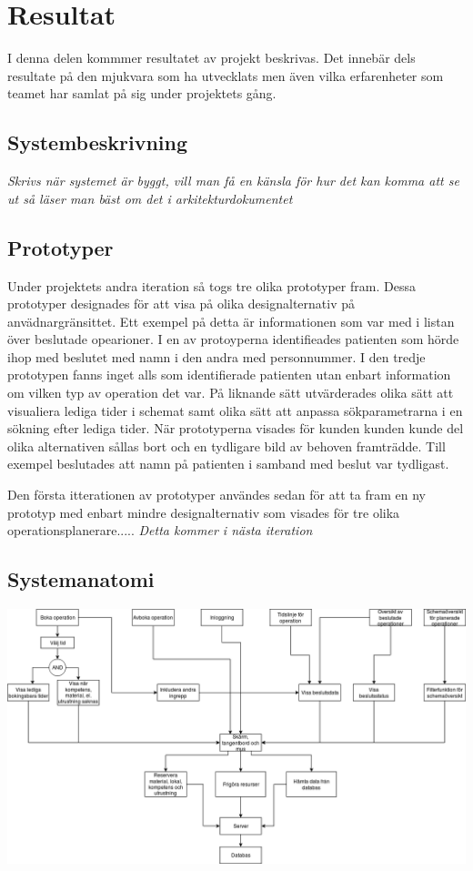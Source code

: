 \chapter{Resultat}
I denna delen kommmer resultatet av projekt beskrivas. Det innebär dels
resultate på den mjukvara som ha utvecklats men även vilka erfarenheter som
teamet har samlat på sig under projektets gång.
\section{Systembeskrivning}
\textit{Skrivs när systemet är byggt, vill man få en känsla för hur det kan
komma att se ut så läser man bäst om det i arkitekturdokumentet}
\section{Prototyper}
Under projektets andra iteration så togs tre olika prototyper fram. Dessa
prototyper designades för att visa på olika designalternativ på
anvädnargränsittet. Ett exempel på detta är informationen som var med i listan
över beslutade opearioner. I en av protoyperna identifieades patienten som hörde
ihop med beslutet med namn i den andra med personnummer. I den tredje prototypen
fanns inget alls som identifierade patienten utan enbart information om vilken
typ av operation det var. På liknande sätt utvärderades olika sätt att
visualiera lediga tider i schemat samt olika sätt att anpassa sökparametrarna i
en sökning efter lediga tider. När prototyperna visades för kunden kunden kunde
del olika alternativen sållas bort och en tydligare bild av behoven framträdde.
Till exempel beslutades att namn på patienten i samband med beslut var tydligast.

Den första itterationen av prototyper användes sedan för att ta fram en ny
prototyp med enbart mindre designalternativ som visades för tre olika
operationsplanerare.....
\textit{Detta kommer i nästa iteration}
\section{Systemanatomi}
\includegraphics[width=\textwidth,height=.7\textheight]{Figures/Systemanatomi.png}\\

